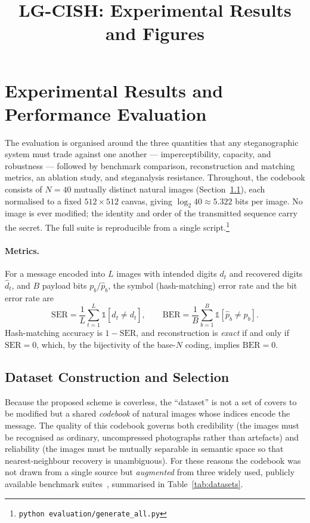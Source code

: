 \documentclass[11pt]{article}
\title{\textbf{LG-CISH: Experimental Results and Figures}}
\author{}\date{}
\begin{document}
\maketitle
\fi

\section{Experimental Results and Performance Evaluation}\label{sec:results}
The evaluation is organised around the three quantities that any steganographic
system must trade against one another --- imperceptibility, capacity, and
robustness --- followed by benchmark comparison, reconstruction and matching
metrics, an ablation study, and steganalysis resistance. Throughout, the codebook
consists of $N{=}40$ mutually distinct natural images (Section~\ref{sec:dataset}),
each normalised to a fixed $512\times512$ canvas, giving $\log_2 40\approx5.322$
bits per image. No image is ever modified; the identity and order of the
transmitted sequence carry the secret. The full suite is reproducible from a single
script.\footnote{\texttt{python evaluation/generate\_all.py}}

\paragraph{Metrics.} For a message encoded into $L$ images with intended digits
$d_t$ and recovered digits $\hat d_t$, and $B$ payload bits $p_b/\hat p_b$, the
symbol (hash-matching) error rate and the bit error rate are
\begin{equation}
  \mathrm{SER}=\frac{1}{L}\sum_{t=1}^{L}\mathbb{1}\!\left[\hat d_t\neq d_t\right],
  \qquad
  \mathrm{BER}=\frac{1}{B}\sum_{b=1}^{B}\mathbb{1}\!\left[\hat p_b\neq p_b\right].
  \label{eq:ber}
\end{equation}
Hash-matching accuracy is $1-\mathrm{SER}$, and reconstruction is \emph{exact}
if and only if $\mathrm{SER}=0$, which, by the bijectivity of the base-$N$ coding,
implies $\mathrm{BER}=0$.

\subsection{Dataset Construction and Selection}\label{sec:dataset}
Because the proposed scheme is coverless, the ``dataset'' is not a set of covers to
be modified but a shared \emph{codebook} of natural images whose indices encode the
message. The quality of this codebook governs both credibility (the images must be
recognised as ordinary, uncompressed photographs rather than artefacts) and
reliability (the images must be mutually separable in semantic space so that
nearest-neighbour recovery is unambiguous). For these reasons the codebook was not
drawn from a single source but \emph{augmented} from three widely used,
publicly available benchmark suites~\cite{ucid,kodak,uscsipi}, summarised in Table~\ref{tab:datasets}.
\end{document}
